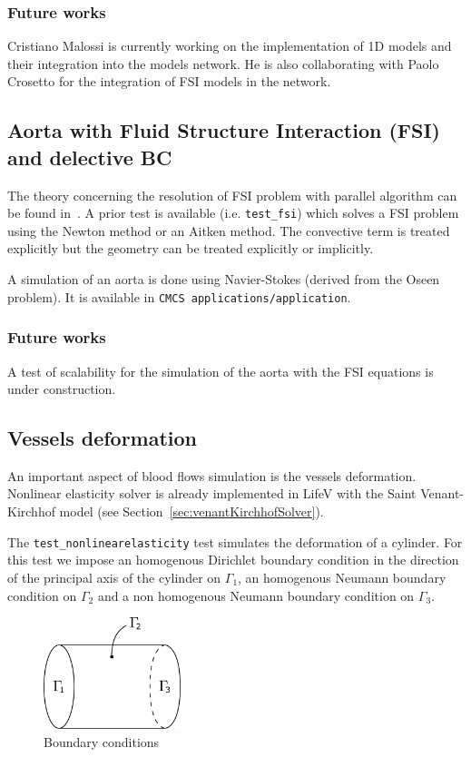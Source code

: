 \documentclass[11pt]{article}
\begin{document}
\subsubsection{Future works}
Cristiano Malossi is currently working on the implementation of 1D models and their integration into the models network. He is also collaborating with Paolo Crosetto for the integration of FSI models in the network.

\subsection{Aorta with Fluid Structure Interaction (FSI) and delective BC}
The theory concerning the resolution of FSI problem with parallel algorithm can be found in~\cite{crosetto}. A prior test is available (i.e. \texttt{test\_fsi}) which solves a FSI problem using the Newton method or an Aitken method. The convective term is treated explicitly but the geometry can be treated explicitly or implicitly.

A simulation of an aorta is done using Navier-Stokes (derived from the Oseen problem). It is available in \texttt{CMCS applications/application}.

\subsubsection{Future works}
A test of scalability for the simulation of the aorta with the FSI equations is under construction.

\subsection{Vessels deformation}
An important aspect of blood flows simulation is the vessels deformation. Nonlinear elasticity solver is already implemented in LifeV with the Saint Venant-Kirchhof model (see Section~\ref{sec:venantKirchhofSolver}).

The \texttt{test\_nonlinearelasticity} test simulates the deformation of a cylinder. For this test we impose an homogenous Dirichlet boundary condition in the direction of the principal axis of the cylinder on $\Gamma_1$, an homogenous Neumann boundary condition on $\Gamma_2$ and a non homogenous Neumann boundary condition on $\Gamma_3$.

\begin{figure}[H]
\begin{center}
\includegraphics[width=4cm]{images/monolitic/cylindredomain.pdf}
\caption{Boundary conditions}
\label{fig:monoliticDomain}
\end{center}
\end{figure}
\end{document}
